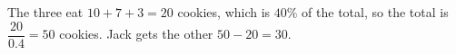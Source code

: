 The three eat $10+7+3=20$ cookies, which is $40\%$ of the total, so the total is $\dfrac{20}{0.4}=50$ cookies. Jack gets the other $50-20=\boxed{30}$.
